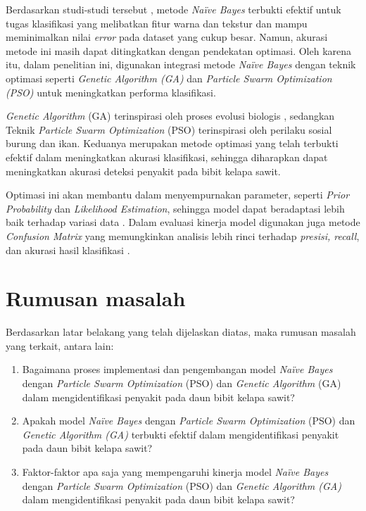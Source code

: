 Berdasarkan studi-studi tersebut \cite{prayoga2019implementasi}\cite{nainggolan2022identifikasi}\cite{febriana2021perbandingan}, metode \textit{Naïve Bayes} terbukti efektif untuk tugas klasifikasi yang melibatkan fitur warna dan tekstur dan mampu meminimalkan nilai \textit{error} pada dataset yang cukup besar. Namun, akurasi metode ini masih dapat ditingkatkan dengan pendekatan optimasi. Oleh karena itu, dalam penelitian ini, digunakan integrasi metode \textit{Naïve Bayes} dengan teknik optimasi seperti \textit{Genetic Algorithm (GA)} dan \textit{Particle Swarm Optimization (PSO)} untuk meningkatkan performa klasifikasi.

\textit{Genetic Algorithm} (GA) terinspirasi oleh proses evolusi biologis \cite{dwiputra2024perancangan}\cite{patmawatioptimalisasi}, sedangkan Teknik \textit{Particle Swarm Optimization} (PSO) terinspirasi oleh perilaku sosial burung dan ikan. Keduanya merupakan metode optimasi yang telah terbukti efektif dalam meningkatkan akurasi klasifikasi, sehingga diharapkan dapat meningkatkan akurasi deteksi penyakit pada bibit kelapa sawit.

Optimasi ini akan membantu dalam menyempurnakan parameter, seperti \textit{Prior Probability} dan \textit{Likelihood Estimation}, sehingga model dapat beradaptasi lebih baik terhadap variasi data \cite{ozsoy2020use}. Dalam evaluasi kinerja model digunakan juga metode \textit{Confusion Matrix} yang memungkinkan analisis lebih rinci terhadap \textit{presisi, recall}, dan akurasi hasil klasifikasi \cite{manurung2024implementasi}.

\section{Rumusan masalah} \label{I.Rumusan Masalah}
\indent Berdasarkan latar belakang yang telah dijelaskan diatas, maka rumusan masalah yang terkait, antara lain:
\begin{enumerate}[noitemsep]
	\item Bagaimana proses implementasi dan pengembangan model \textit{Naïve Bayes} dengan \textit{Particle Swarm Optimization} (PSO) dan \textit{Genetic Algorithm} (GA) dalam mengidentifikasi penyakit pada daun bibit kelapa sawit?
	\item Apakah model \textit{Naïve Bayes} dengan \textit{Particle Swarm Optimization} (PSO) dan \textit{Genetic Algorithm (GA)} terbukti efektif dalam mengidentifikasi penyakit pada daun bibit kelapa sawit?
	\item Faktor-faktor apa saja yang mempengaruhi kinerja model \textit{Naïve Bayes} dengan \textit{Particle Swarm Optimization} (PSO) dan \textit{Genetic Algorithm (GA)} dalam mengidentifikasi penyakit pada daun bibit kelapa sawit?
\end{enumerate}

